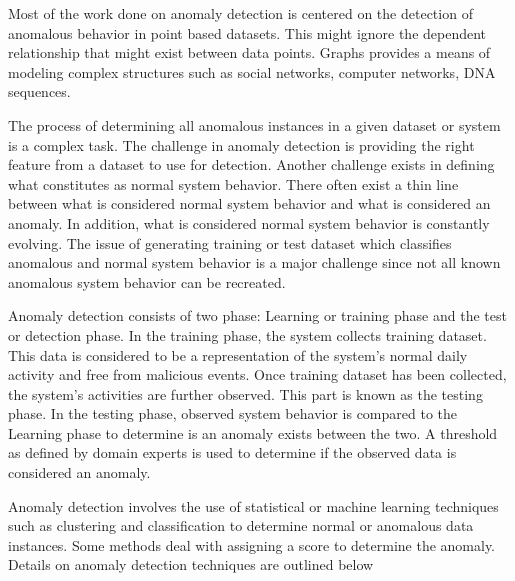 Most of the work done on anomaly detection is centered on the detection of anomalous behavior in point based datasets. This might ignore the dependent relationship that might exist between data points. Graphs provides a means of modeling complex structures such as social networks, computer networks, DNA sequences. 

The process of determining all anomalous instances in a given dataset or system is a complex task. The challenge in anomaly detection is providing the right feature from a dataset to use for detection. Another challenge exists in defining what constitutes as normal system behavior. There often exist a thin line between what is considered normal system behavior and what is considered an anomaly. In addition, what is considered normal system behavior is constantly evolving. The issue of generating training or test dataset which classifies anomalous  and normal system behavior is a major challenge since not all known anomalous system behavior can be recreated.

Anomaly detection consists of two phase: Learning or training phase and the test or detection phase. In the training phase, the system collects training dataset. This data is considered to be a representation of the system's normal daily activity and free from malicious events. Once training dataset has been collected, the system's activities are further observed. This part is known as the testing phase. In the testing phase,  observed system behavior is compared to the Learning phase to determine is an anomaly exists between the two. A threshold as defined by domain experts is used to determine if the observed data is considered an anomaly.


Anomaly detection involves the use of statistical or machine learning techniques  such as clustering and classification to determine normal or anomalous data instances. Some methods deal with assigning a score to determine the anomaly. Details on anomaly detection techniques are outlined below


